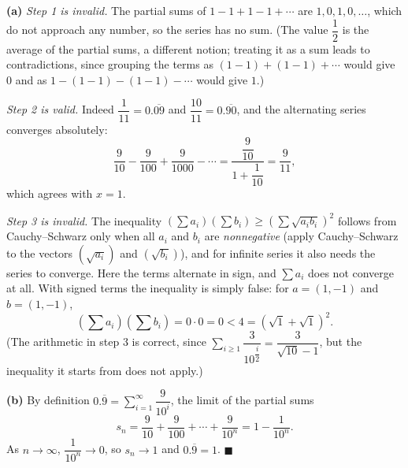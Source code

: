\textbf{(a)} \emph{Step 1 is invalid.} The partial sums of $1-1+1-1+\cdots$ are $1,0,1,0,\dots$, which do not approach any number, so the series has no sum. (The value $\dfrac12$ is the average of the partial sums, a different notion; treating it as a sum leads to contradictions, since grouping the terms as $(1-1)+(1-1)+\cdots$ would give $0$ and as $1-(1-1)-(1-1)-\cdots$ would give $1$.)

\emph{Step 2 is valid.} Indeed $\dfrac{1}{11}=0.\overline{09}$ and $\dfrac{10}{11}=0.\overline{90}$, and the alternating series converges absolutely:
\[\dfrac{9}{10}-\dfrac{9}{100}+\dfrac{9}{1000}-\cdots=\dfrac{\dfrac{9}{10}}{1+\dfrac{1}{10}}=\dfrac{9}{11},\]
which agrees with $x=1$.

\emph{Step 3 is invalid.} The inequality $\left(\sum a_i\right)\left(\sum b_i\right)\ge\left(\sum\sqrt{a_ib_i}\right)^2$ follows from Cauchy--Schwarz only when all $a_i$ and $b_i$ are \emph{nonnegative} (apply Cauchy--Schwarz to the vectors $(\sqrt{a_i})$ and $(\sqrt{b_i})$), and for infinite series it also needs the series to converge. Here the terms alternate in sign, and $\sum a_i$ does not converge at all. With signed terms the inequality is simply false: for $a=(1,-1)$ and $b=(1,-1)$,
\[\left(\sum a_i\right)\left(\sum b_i\right)=0\cdot0=0<4=\left(\sqrt1+\sqrt1\right)^2.\]
(The arithmetic in step 3 is correct, since $\sum_{i\ge1}\dfrac{3}{10^{\dfrac i2}}=\dfrac{3}{\sqrt{10}-1}$, but the inequality it starts from does not apply.)

\textbf{(b)} By definition $0.\overline{9}=\displaystyle\sum_{i=1}^{\infty}\dfrac{9}{10^i}$, the limit of the partial sums
\[s_n=\dfrac{9}{10}+\dfrac{9}{100}+\cdots+\dfrac{9}{10^n}=1-\dfrac{1}{10^n}.\]
As $n\to\infty$, $\dfrac{1}{10^n}\to0$, so $s_n\to1$ and $\boxed{0.\overline{9}=1}$. $\blacksquare$
